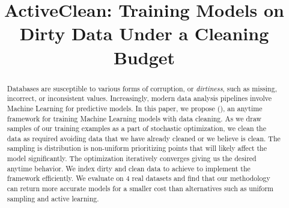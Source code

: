 \documentclass{vldb}
\begin{document}
\newcommand{\reminder}[1]{{{\textcolor{magenta}{\{\{\bf #1\}\}}}\xspace}}
\newcommand{\specialcell}[2][c]{%
  \begin{tabular}[#1]{@{}c@{}}#2\end{tabular}}

\def\ojoin{\setbox0=\hbox{$\bowtie$}%
  \rule[-.02ex]{.25em}{.4pt}\llap{\rule[\ht0]{.25em}{.4pt}}}
\def\leftouterjoin{\mathbin{\ojoin\mkern-5.8mu\bowtie}}
\def\rightouterjoin{\mathbin{\bowtie\mkern-5.8mu\ojoin}}
\def\fullouterjoin{\mathbin{\ojoin\mkern-5.8mu\bowtie\mkern-5.8mu\ojoin}}


\pagestyle{plain}

\title{ActiveClean: Training Models on Dirty Data Under a Cleaning Budget}



%



\maketitle

\begin{abstract}
Databases are susceptible to various forms of corruption, or \emph{dirtiness}, such as missing, incorrect, or inconsistent values.
Increasingly, modern data analysis pipelines involve Machine Learning for predictive models.
In this paper, we propose \sysfull (\sys), an anytime framework for training Machine Learning models with data cleaning.
As we draw samples of our training examples as a part of stochastic optimization, we clean the data as required avoiding data that we have already cleaned or we believe is clean.
The sampling is distribution is non-uniform prioritizing points that will likely affect the model significantly.
The optimization iteratively converges giving us the desired anytime behavior.
We index dirty and clean data to achieve to implement the framework efficiently.
We evaluate \sys on 4 real datasets and find that our methodology can return more accurate models for a smaller cost than alternatives such as uniform sampling and active learning.
\end{abstract}
\end{document}

